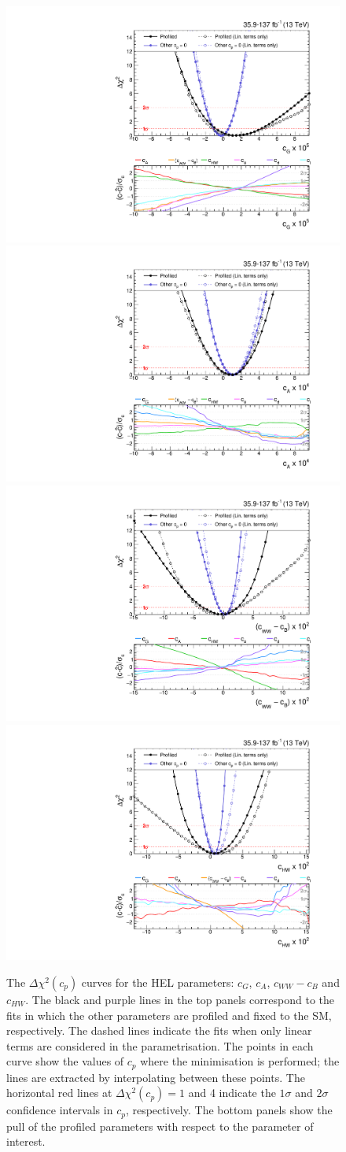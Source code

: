 \begin{figure}
  \centering
  \includegraphics[width=.49\textwidth]{Figures/eft/chi2/observed/cG.pdf}
  \includegraphics[width=.49\textwidth]{Figures/eft/chi2/observed/cA.pdf}
  \includegraphics[width=.49\textwidth]{Figures/eft/chi2/observed/cWWMinuscB.pdf}
  \includegraphics[width=.49\textwidth]{Figures/eft/chi2/observed/cHW.pdf}
  \caption[Simplified HEL re-interpretation: $c_G$, $c_A$, $c_{WW}-c_B$ and $c_{HW}$]
  {
    The $\Delta\chi^2(c_p)$ curves for the HEL parameters: $c_G$, $c_A$, $c_{WW}-c_B$ and $c_{HW}$. The black and purple lines in the top panels correspond to the fits in which the other parameters are profiled and fixed to the SM, respectively. The dashed lines indicate the fits when only linear terms are considered in the parametrisation. The points in each curve show the values of $c_p$ where the minimisation is performed; the lines are extracted by interpolating between these points. The horizontal red lines at $\Delta\chi^2(c_p)=1$ and 4 indicate the $1\sigma$ and $2\sigma$ confidence intervals in $c_p$, respectively. The bottom panels show the pull of the profiled parameters with respect to the parameter of interest. 
  }
  \label{fig:hel_chi2_simplified_0}
\end{figure}


